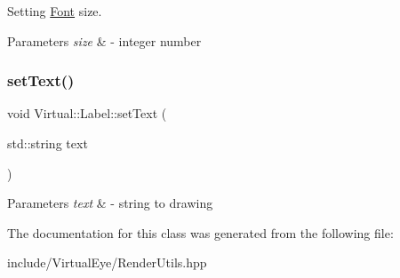 Setting \hyperlink{class_virtual_1_1_font}{Font} size. 


\begin{DoxyParams}{Parameters}
{\em size} & -\/ integer number \\
\hline
\end{DoxyParams}
\hypertarget{class_virtual_1_1_label_a1b737a96ea06f214120c61dc2465536f}{}\label{class_virtual_1_1_label_a1b737a96ea06f214120c61dc2465536f} 
\subsubsection{\texorpdfstring{set\+Text()}{setText()}}
{\footnotesize\ttfamily void Virtual\+::\+Label\+::set\+Text (\begin{DoxyParamCaption}\item[{std\+::string}]{text }\end{DoxyParamCaption})}


\begin{DoxyParams}{Parameters}
{\em text} & -\/ string to drawing \\
\hline
\end{DoxyParams}


The documentation for this class was generated from the following file\+:\begin{DoxyCompactItemize}
\item 
include/\+Virtual\+Eye/Render\+Utils.\+hpp\end{DoxyCompactItemize}
